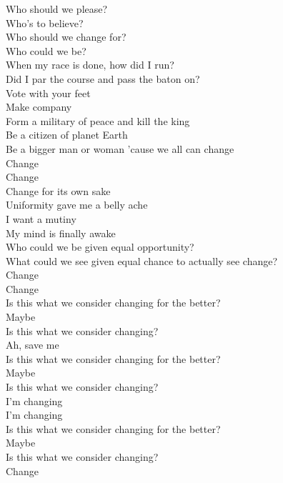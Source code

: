 




Who should we please?\\
Who's to believe?\\
Who should we change for?\\
Who could we be?\\
When my race is done, how did I run?\\
Did I par the course and pass the baton on?\\

Vote with your feet\\
Make company\\
Form a military of peace and kill the king\\
Be a citizen of planet Earth\\
Be a bigger man or woman 'cause we all can change\\

Change\\
Change\\

Change for its own sake\\
Uniformity gave me a belly ache\\
I want a mutiny\\
My mind is finally awake\\
Who could we be given equal opportunity?\\
What could we see given equal chance to actually see change?\\

Change\\
Change\\

Is this what we consider changing for the better?\\
Maybe\\

Is this what we consider changing?\\
Ah, save me\\
Is this what we consider changing for the better?\\
Maybe\\
Is this what we consider changing?\\

I'm changing\\
I'm changing\\
Is this what we consider changing for the better?\\
Maybe\\
Is this what we consider changing?\\
Change\\

